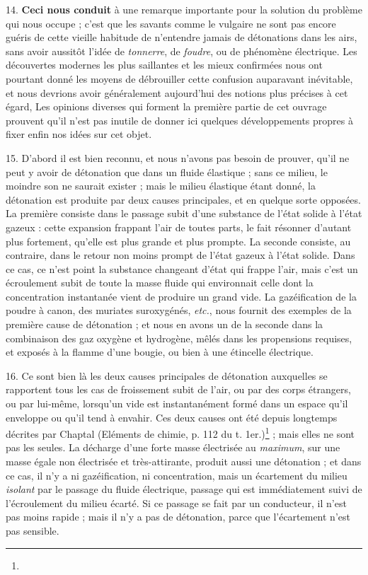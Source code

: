 \documentclass[a4paper, 11pt, oneside, polutonikogreek, french]{article}
\begin{document}
14. \textbf{Ceci nous conduit} à une remarque importante pour la solution du problème qui nous occupe ; c'est que les savants comme le vulgaire ne sont pas encore guéris de cette vieille habitude de n'entendre jamais de détonations dans les airs, sans avoir aussitôt l'idée de \emph{tonnerre}, de \emph{foudre}, ou de phénomène électrique. Les découvertes modernes les plus saillantes et les mieux confirmées nous ont pourtant donné les moyens de débrouiller cette confusion auparavant inévitable, et nous devrions avoir généralement aujourd’hui des notions plus précises à cet égard, Les opinions diverses qui forment la première partie de cet ouvrage prouvent qu'il n'est pas inutile de donner ici quelques développements propres à fixer enfin nos idées sur cet objet.

15. D'abord il est bien reconnu, et nous n'avons pas besoin de prouver, qu'il ne peut y avoir de détonation que dans un fluide élastique ; sans ce milieu, le moindre son ne saurait exister ; mais le milieu élastique étant donné, la détonation est produite par deux causes principales, et en quelque sorte opposées. La première consiste dans le passage subit d'une substance de l'état solide à l'état gazeux : cette expansion frappant l'air de toutes parts, le fait résonner d'autant plus fortement, qu'elle est plus grande et plus prompte. La seconde consiste, au contraire, dans le retour non moins prompt de l'état gazeux à l'état solide. Dans ce cas, ce n'est point la substance changeant d'état qui frappe l'air, mais c'est un écroulement subit de toute la masse fluide qui environnait celle dont la concentration instantanée vient de produire un grand vide. La gazéification de la poudre à canon, des muriates suroxygénés, \emph{etc.}, nous fournit des exemples de la première cause de détonation ; et nous en avons un de la seconde dans la combinaison des gaz oxygène et hydrogène, mêlés dans les propensions requises, et exposés à la flamme d'une bougie, ou bien à une étincelle électrique.

16. Ce sont bien là les deux causes principales de détonation auxquelles se rapportent tous les cas de froissement subit de l'air, ou par des corps étrangers, ou par lui-même, lorsqu'un vide est instantanément formé dans un espace qu'il enveloppe ou qu'il tend à envahir. Ces deux causes ont été depuis longtemps décrites par Chaptal (Eléments de chimie, p. 112 du t. 1er.)\footnote{} ; mais elles ne sont pas les seules. La décharge d'une forte masse électrisée au \emph{maximum}, sur une masse égale non électrisée et très-attirante, produit aussi une détonation ; et dans ce cas, il n'y a ni gazéification, ni concentration, mais un écartement du milieu \emph{isolant} par le passage du fluide électrique, passage qui est immédiatement suivi de l'écroulement du milieu écarté. Si ce passage se fait par un conducteur, il n'est pas moins rapide ; mais il n'y a pas de détonation, parce que l'écartement n'est pas sensible.
\end{document}
